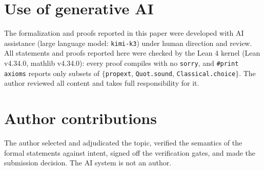 \documentclass[11pt]{article}
\theoremstyle{definition}
\begin{document}
\section*{Use of generative AI}

The formalization and proofs reported in this paper were developed with AI
assistance (large language model: \texttt{kimi-k3}) under human direction
and review. All statements and proofs reported here were checked by the Lean
4 kernel (Lean v4.34.0, mathlib v4.34.0): every proof compiles with no
\texttt{sorry}, and \texttt{\#print axioms} reports only subsets of
$\{$\texttt{propext}, \texttt{Quot.sound}, \texttt{Classical.choice}$\}$.
The author reviewed all content and takes full responsibility for it.

\section*{Author contributions}
The author selected and adjudicated the topic, verified the semantics of the
formal statements against intent, signed off the verification gates, and made
the submission decision. The AI system is not an author.
\end{document}
